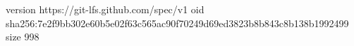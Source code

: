 version https://git-lfs.github.com/spec/v1
oid sha256:7e2f9bb302e60b5e02f63c565ac90f70249d69ed3823b8b843c8b138b1992499
size 998

